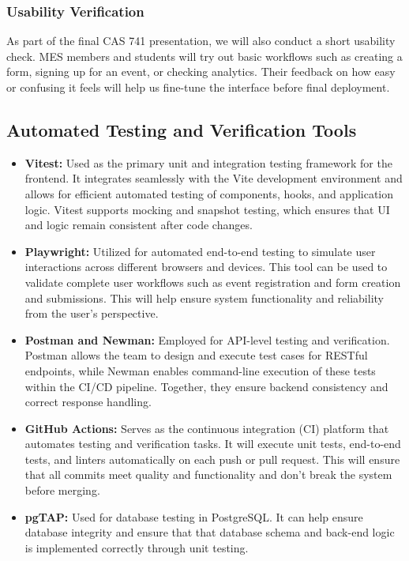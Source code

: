 \documentclass[12pt, titlepage]{article}
\begin{document}
\subsubsection*{Usability Verification}
As part of the final CAS 741 presentation, we will also conduct a short usability check. MES members and students will try out basic workflows such as creating a form, signing up for an event, or checking analytics. Their feedback on how easy or confusing it feels will help us fine-tune the interface before final deployment.

\subsection{Automated Testing and Verification Tools}

\begin{itemize}
    \item \textbf{Vitest:} Used as the primary unit and integration testing framework for the frontend. It integrates seamlessly with the Vite development environment and allows for efficient automated testing of components, hooks, and application logic. Vitest supports mocking and snapshot testing, which ensures that UI and logic remain consistent after code changes.

    \item \textbf{Playwright:} Utilized for automated end-to-end testing to simulate user interactions across different browsers and devices. This tool can be used to validate complete user workflows such as event registration and form creation and submissions. This will help ensure system functionality and reliability from the user's perspective.

    \item \textbf{Postman and Newman:} Employed for API-level testing and verification. Postman allows the team to design and execute test cases for RESTful endpoints, while Newman enables command-line execution of these tests within the CI/CD pipeline. Together, they ensure backend consistency and correct response handling.

    \item \textbf{GitHub Actions:} Serves as the continuous integration (CI) platform that automates testing and verification tasks. It will execute unit tests, end-to-end tests, and linters automatically on each push or pull request. This will ensure that all commits meet quality and functionality and don't break the system before merging.

    \item \textbf{pgTAP:} Used for database testing in PostgreSQL. It can help ensure database integrity and ensure that that database schema and back-end logic is implemented correctly through unit testing.
\end{itemize}
\end{document}
